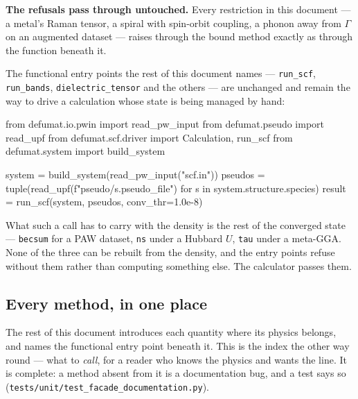 \documentclass[11pt,a4paper]{article}
\newcommand{\code}[1]{\texttt{\small #1}}
\begin{document}
\textbf{The refusals pass through untouched.} Every restriction in this document
--- a metal's Raman tensor, a spiral with spin-orbit coupling, a phonon away from
$\Gamma$ on an augmented dataset --- raises through the bound method exactly as
through the function beneath it.

The functional entry points the rest of this document names --- \code{run\_scf},
\code{run\_bands}, \code{dielectric\_tensor} and the others --- are unchanged and
remain the way to drive a calculation whose state is being managed by hand:

\begin{pycode}
from defumat.io.pwin import read_pw_input
from defumat.pseudo import read_upf
from defumat.scf.driver import Calculation, run_scf
from defumat.system import build_system

system = build_system(read_pw_input("scf.in"))
pseudos = tuple(read_upf(f"pseudo/{s.pseudo_file}") for s in system.structure.species)
result = run_scf(system, pseudos, conv_thr=1.0e-8)
\end{pycode}

What such a call has to carry with the density is the rest of the converged
state --- \code{becsum} for a PAW dataset, \code{ns} under a Hubbard $U$,
\code{tau} under a meta-GGA. None of the three can be rebuilt from the density,
and the entry points refuse without them rather than computing something else.
The calculator passes them.

\subsection*{Every method, in one place}

The rest of this document introduces each quantity where its physics belongs,
and names the functional entry point beneath it. This is the index the other way
round --- what to \emph{call}, for a reader who knows the physics and wants the
line. It is complete: a method absent from it is a documentation bug, and a test
says so (\code{tests/unit/test\_facade\_documentation.py}).
\end{document}
